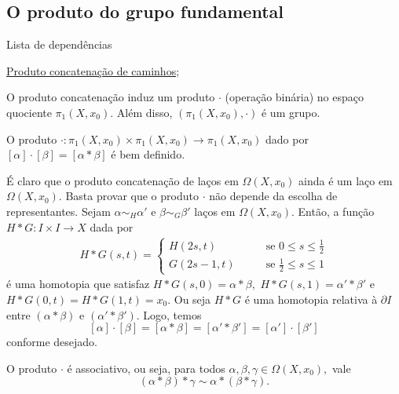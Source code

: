 \subsection{O produto do grupo fundamental} %
\label{produto-bem-definido-prop}
\begin{titlemize}{Lista de dependências}
	\item \hyperref[Produto-concatenacao-def]{Produto concatenação de caminhos};\\ %
\end{titlemize}
O produto concatenação induz um produto $\cdot$ (operação binária) no espaço quociente $\pi_1(X,x_0)$. Além disso, $(\pi_1(X,x_0),\cdot)$ é um grupo.

\begin{lemma}%
    O produto $\cdot:\pi_1(X,x_0)\times\pi_1(X,x_0)\rightarrow \pi_1(X,x_0)$ dado por $[\alpha]\cdot[\beta]=[\alpha*\beta]$ é bem definido.
\end{lemma}

\begin{dem}
    É claro que o produto concatenação de laços em $\Omega(X,x_0)$ ainda é um laço em $\Omega(X,x_0).$ Basta provar que o produto $\cdot$ não depende da escolha de representantes. Sejam $\alpha\sim_H \alpha'$ e $\beta\sim_G\beta'$ laços em $\Omega(X,x_0)$. Então, a função $H*G:I\times I\rightarrow X$ dada por 
    \begin{align*}
        H*G(s,t)=\begin{cases}
            H(2s,t)\;\;\;&\;\;\;\mbox{ se }0\le s\le \frac{1}{2}\\
            G(2s-1,t)\;\;\;&\;\;\;\mbox{ se }\frac{1}{2}\le s\le1
        \end{cases}
    \end{align*}
    é uma homotopia que satisfaz $H*G(s,0)=\alpha*\beta,$ $H*G(s,1)=\alpha'*\beta'$ e $H*G(0,t)=H*G(1,t)=x_0.$ Ou seja $H*G$ é uma homotopia relativa à $\partial I$ entre $(\alpha*\beta)$ e $(\alpha'*\beta').$ Logo, temos  
    $$[\alpha]\cdot[\beta]=[\alpha*\beta]=[\alpha'*\beta']=[\alpha']\cdot [\beta']$$
    conforme desejado.
\end{dem}

\begin{lemma}
    O produto $\cdot$ é associativo, ou seja, para todos $\alpha,\beta,\gamma\in\Omega(X,x_0),$ vale
    \[(\alpha*\beta)*\gamma\sim \alpha*(\beta*\gamma).\]
\end{lemma}

